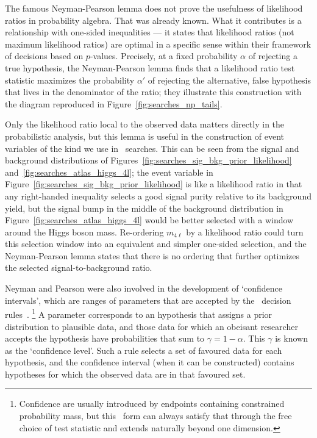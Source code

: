 The famous Neyman-Pearson lemma does not prove the usefulness of likelihood
ratios in probability algebra.
That was already known.
What it contributes is a relationship with one-sided inequalities ---
it states that likelihood ratios (not maximum likelihood ratios)
are optimal in a specific sense within their framework of decisions
based on $p$-values.
Precisely, at a fixed probability $\alpha$ of rejecting a true hypothesis,
the Neyman-Pearson lemma finds that a likelihood ratio test statistic maximizes
the probability $\alpha'$ of rejecting the alternative, false hypothesis that
lives in the denominator of the ratio; they illustrate this construction with
the diagram reproduced in Figure~\ref{fig:searches_np_tails}.

Only the likelihood ratio local to the observed data matters directly in the
probabilistic analysis, but this lemma is useful in the construction
of event variables of the kind we use in \atlas\ searches.
This can be seen from the signal and background distributions of
Figures~\ref{fig:searches_sig_bkg_prior_likelihood}
and~\ref{fig:searches_atlas_higgs_4l};
the event variable in Figure~\ref{fig:searches_sig_bkg_prior_likelihood} is
like a likelihood ratio in that any right-handed inequality selects a good
signal purity relative to its background yield, but the signal bump in the
middle of the background distribution in
Figure~\ref{fig:searches_atlas_higgs_4l} would be better selected with a
window around the Higgs boson mass.
Re-ordering $m_{4\ell}$ by a likelihood ratio could turn this selection window
into an equivalent and simpler one-sided selection, and the Neyman-Pearson
lemma states that there is no ordering that further optimizes the selected
signal-to-background ratio.

Neyman and Pearson were also involved in the development of
`confidence intervals', which are ranges of parameters that are
accepted by the \pvalue\ decision rules~\cite{
clopper1934confidence,
neyman1935Intervals,
Neyman1937Outline
}.%
\footnote{%
Confidence are usually introduced by endpoints containing constrained
probability mass, but this \pvalue\ form can always satisfy that through the
free choice of test statistic and extends naturally beyond one dimension.%
}
A parameter corresponds to an hypothesis that assigns a prior distribution to
plausible data, and those data for which an obeisant researcher accepts the
hypothesis have probabilities that sum to $\gamma = 1 - \alpha$.
This $\gamma$ is known as the `confidence level'.
Such a rule selects a set of favoured data for each hypothesis, and the
confidence interval (when it can be constructed) contains hypotheses for which
the observed data are in that favoured set.

